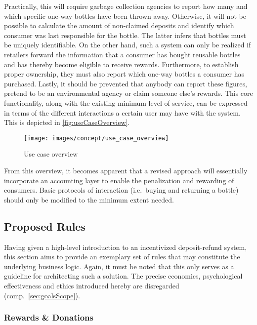 Practically, this will require garbage collection agencies to report how many and which specific one-way bottles have been thrown away. Otherwise, it will not be possible to calculate the amount of non-claimed deposits and identify which consumer was last responsible for the bottle. The latter infers that bottles must be uniquely identifiable. On the other hand, such a system can only be realized if retailers forward the information that a consumer has bought reusable bottles and has thereby become eligible to receive rewards. Furthermore, to establish proper ownership, they must also report which one-way bottles a consumer has purchased. Lastly, it should be prevented that anybody can report these figures, pretend to be an environmental agency or claim someone else's rewards. This core functionality, along with the existing minimum level of service, can be expressed in terms of the different interactions a certain user may have with the system. This is depicted in \autoref{fig:useCaseOverview}.

\begin{figure}[hbt]
  \texttt{[image: images/concept/use\_case\_overview]}
  \caption{Use case overview}
  \label{fig:useCaseOverview}
\end{figure}

\FloatBarrier

From this overview, it becomes apparent that a revised approach will essentially incorporate an accounting layer to enable the penalization and rewarding of consumers. Basic protocols of interaction (i.e.~buying and returning a bottle) should only be modified to the minimum extent needed.

\subsection{Proposed Rules}
\label{sec:rules}
Having given a high-level introduction to an incentivized deposit-refund system, this section aims to provide an exemplary set of rules that may constitute the underlying business logic. Again, it must be noted that this only serves as a guideline for architecting such a solution. The precise economics, psychological effectiveness and ethics introduced hereby are disregarded (comp.~\ref{sec:goalsScope}).

\subsubsection{Rewards \& Donations}

